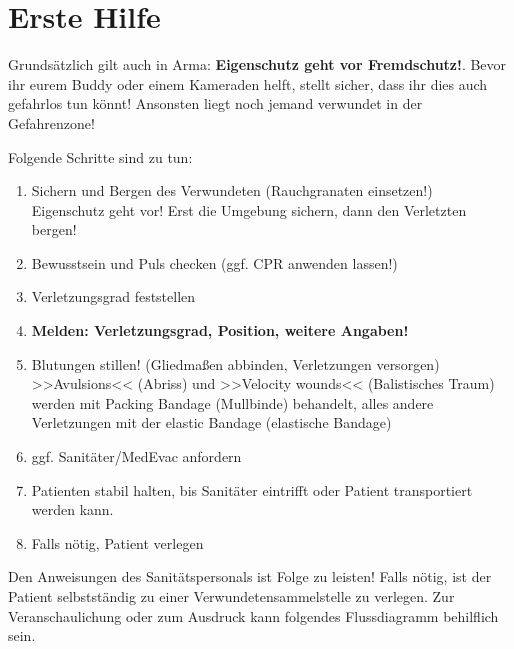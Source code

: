 \pagebreak
\section{Erste Hilfe}
Grundsätzlich gilt auch in Arma: \textbf{Eigenschutz geht vor Fremdschutz!}. Bevor ihr eurem Buddy oder einem Kameraden helft, stellt sicher, dass ihr dies auch gefahrlos tun könnt! Ansonsten liegt noch jemand verwundet in der Gefahrenzone!
\par\medskip
Folgende Schritte sind zu tun:
\begin{enumerate}
	\item Sichern und Bergen des Verwundeten (Rauchgranaten einsetzen!)\\
			Eigenschutz geht vor! Erst die Umgebung sichern, dann den Verletzten bergen! 
	\item Bewusstsein und Puls checken (ggf. CPR anwenden lassen!)
	\item Verletzungsgrad feststellen
	\item \textbf{Melden: Verletzungsgrad, Position, weitere Angaben!}
	\item Blutungen stillen! (Gliedmaßen abbinden, Verletzungen versorgen) \newline
	 >>Avulsions<< (Abriss) und >>Velocity wounds<< (Balistisches Traum) werden mit Packing Bandage (Mullbinde) behandelt, alles andere Verletzungen mit der elastic Bandage (elastische Bandage)
	\item ggf. Sanitäter/MedEvac anfordern
	\item Patienten stabil halten, bis Sanitäter eintrifft oder Patient transportiert werden kann.
	\item Falls nötig, Patient verlegen
\end{enumerate}
Den Anweisungen des Sanitätspersonals ist Folge zu leisten! Falls nötig, ist der Patient selbstständig zu einer Verwundetensammelstelle zu verlegen.
Zur Veranschaulichung oder zum Ausdruck kann folgendes Flussdiagramm behilflich sein.

